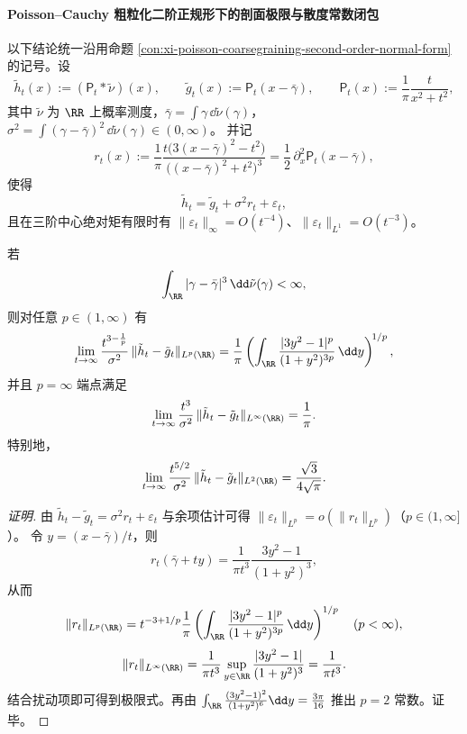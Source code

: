 \paragraph{Poisson--Cauchy 粗粒化二阶正规形下的剖面极限与散度常数闭包}
以下结论统一沿用命题 \ref{con:xi-poisson-coarsegraining-second-order-normal-form} 的记号。设
\[
\tilde h_t(x):=(\mathsf P_t*\tilde\nu)(x),\qquad
\tilde g_t(x):=\mathsf P_t(x-\bar\gamma),\qquad
\mathsf P_t(x):=\frac{1}{\pi}\frac{t}{x^2+t^2},
\]
其中 \(\tilde\nu\) 为 \(\RR\) 上概率测度，\(\bar\gamma=\int \gamma\,\dd\tilde\nu(\gamma)\)，\(\sigma^2=\int(\gamma-\bar\gamma)^2\,\dd\tilde\nu(\gamma)\in(0,\infty)\)。
并记
\[
r_t(x):=\frac{1}{\pi}\frac{t\bigl(3(x-\bar\gamma)^2-t^2\bigr)}{\bigl((x-\bar\gamma)^2+t^2\bigr)^3}
=\frac12\,\partial_x^2\mathsf P_t(x-\bar\gamma),
\]
使得
\[
\tilde h_t=\tilde g_t+\sigma^2 r_t+\varepsilon_t,
\]
且在三阶中心绝对矩有限时有 \(\|\varepsilon_t\|_\infty=O(t^{-4})\)、\(\|\varepsilon_t\|_{L^1}=O(t^{-3})\)。

\begin{conclusion}\label{con:xi-poisson-lp-spectrum-sharp-family}
若
\[
\int_{\RR}|\gamma-\bar\gamma|^3\,\dd\tilde\nu(\gamma)<\infty,
\]
则对任意 \(p\in(1,\infty)\) 有
\[
\lim_{t\to\infty}
\frac{t^{3-\frac1p}}{\sigma^2}\,
\|\tilde h_t-\tilde g_t\|_{L^p(\RR)}
=
\frac1\pi\left(\int_{\RR}\frac{|3y^2-1|^p}{(1+y^2)^{3p}}\,\dd y\right)^{\!1/p},
\]
并且 \(p=\infty\) 端点满足
\[
\lim_{t\to\infty}
\frac{t^3}{\sigma^2}\,
\|\tilde h_t-\tilde g_t\|_{L^\infty(\RR)}
=\frac1\pi.
\]
特别地，
\[
\lim_{t\to\infty}
\frac{t^{5/2}}{\sigma^2}\,
\|\tilde h_t-\tilde g_t\|_{L^2(\RR)}
=\frac{\sqrt3}{4\sqrt\pi}.
\]
\end{conclusion}
\begin{proof}[证明]
由
\(
\tilde h_t-\tilde g_t=\sigma^2 r_t+\varepsilon_t
\)
与余项估计可得 \(\|\varepsilon_t\|_{L^p}=o(\|r_t\|_{L^p})\)（\(p\in(1,\infty]\)）。
令 \(y=(x-\bar\gamma)/t\)，则
\[
r_t(\bar\gamma+ty)=\frac{1}{\pi t^3}\frac{3y^2-1}{(1+y^2)^3},
\]
从而
\[
\|r_t\|_{L^p(\RR)}
=t^{-3+1/p}\frac1\pi\left(\int_{\RR}\frac{|3y^2-1|^p}{(1+y^2)^{3p}}\,\dd y\right)^{1/p}\quad(p<\infty),
\]
\[
\|r_t\|_{L^\infty(\RR)}
=\frac{1}{\pi t^3}\sup_{y\in\RR}\frac{|3y^2-1|}{(1+y^2)^3}
=\frac{1}{\pi t^3}.
\]
结合扰动项即可得到极限式。再由
\(
\int_{\RR}\frac{(3y^2-1)^2}{(1+y^2)^6}\dd y=\frac{3\pi}{16}
\)
推出 \(p=2\) 常数。证毕。
\end{proof}


